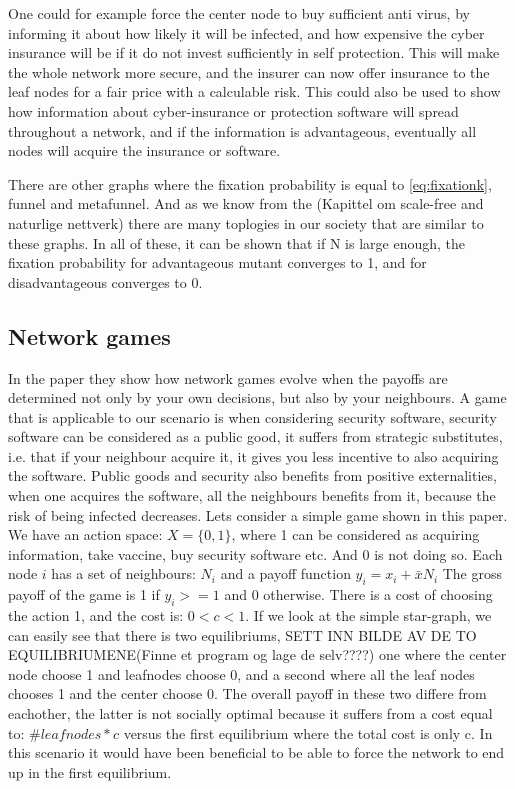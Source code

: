 One could for example force the center node to buy sufficient anti virus, 
by informing it about how likely it will be infected, and how expensive the cyber insurance will be if 
it do not invest sufficiently in self protection. This will make the whole network more secure, 
and the insurer can now offer insurance to the leaf nodes for a fair price with a calculable risk. 
This could also be used to show how information about cyber-insurance or protection software will
spread throughout a network, and if the information is advantageous, eventually all nodes will acquire
the insurance or software.
    
There are other graphs where the fixation probability is equal to \ref{eq:fixationk}, funnel and
metafunnel. And as we know from the (Kapittel om scale-free and naturlige nettverk) there are many
toplogies in our society that are similar to these graphs.  In all of these, it can be
shown that if N is large enough, the fixation probability for advantageous mutant converges to 1, 
and for disadvantageous converges to 0.

\subsection{Network games}
In the paper \cite{networkgames} they show how network games evolve when the payoffs are determined not only by your own decisions, but also by your neighbours. 
A game that is applicable to our scenario is when considering security software, 
security software can be considered as a public good, it suffers from strategic substitutes, i.e. 
that if your neighbour acquire it, it gives you less incentive to also acquiring the software. 
Public goods and security also benefits from positive externalities, when one acquires the software, 
all the neighbours benefits from it, because the risk of being infected decreases.
Lets consider a simple game shown in this paper.
We have an action space: $X=\{0,1\}$, where 1 can be considered as acquiring information, take vaccine, buy security software etc. And 0 is not doing so.
Each node $i$ has a set of neighbours: $N_{i} $ and a payoff function $y_{i}=x_{i}+\bar{x}N_{i}$
The gross payoff of the game is 1 if $y_{i}>=1$ and 0 otherwise. There is a cost of choosing the action 1, and the cost is: $0<c<1$.
 If we look at the simple star-graph, we can easily see that there is two equilibriums, 
 SETT INN BILDE AV DE TO EQUILIBRIUMENE(Finne et program og lage de selv????)
 one where the center node choose 1 and leafnodes choose 0, and a second where all the leaf nodes chooses 1 and the center choose 0.
The overall payoff in these two differe from eachother, the latter is not socially optimal because it
 suffers from a cost equal to: $\#leaf nodes * c$ versus the first equilibrium where the total cost is only c.
In this scenario it would have been beneficial to be able to force the network to end up in the first equilibrium. 
 



